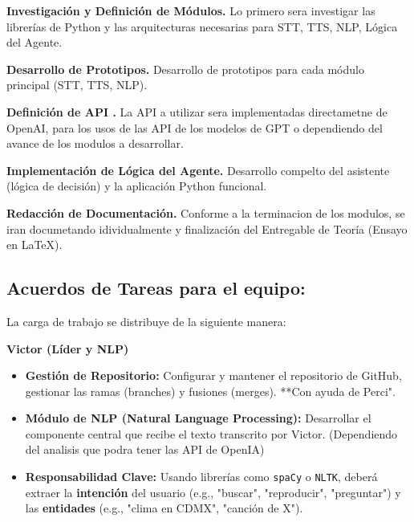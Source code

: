 \documentclass[a4paper,12pt]{article}
\begin{document}
\begin{description}
    \item\textbf{Investigación y Definición de Módulos.} Lo primero sera investigar las librerías de Python y las arquitecturas necesarias para STT, TTS, NLP, Lógica del Agente.
    
    \item \textbf{Desarrollo de Prototipos.} Desarrollo de prototipos para cada módulo principal (STT, TTS, NLP).
    
    \item\textbf{Definición de API .} La API a utilizar sera implementadas directametne de OpenAI, para los usos de las API de los modelos de GPT o dependiendo del avance de los modulos a desarrollar.
    
    \item\textbf{Implementación de Lógica del Agente.} Desarrollo compelto del asistente (lógica de decisión) y la aplicación Python funcional.
    
    \item\textbf{Redacción de Documentación.} Conforme a la terminacion de los modulos, se iran documetando idividualmente y finalización del Entregable de Teoría (Ensayo en LaTeX).
    
\end{description}


\subsection{Acuerdos de Tareas para el equipo:}
La carga de trabajo se distribuye de la siguiente manera:

\textbf{Victor (Líder y NLP)}
\begin{itemize}
    \item \textbf{Gestión de Repositorio:} Configurar y mantener el repositorio de GitHub, gestionar las ramas (branches) y fusiones (merges). **Con ayuda de Perci".
    \item \textbf{Módulo de NLP (Natural Language Processing):} Desarrollar el componente central que recibe el texto transcrito por Victor. (Dependiendo del analisis que podra tener las API de OpenIA)
    \item \textbf{Responsabilidad Clave:} Usando librerías como \texttt{spaCy} o \texttt{NLTK}, deberá extraer la \textbf{intención} del usuario (e.g., "buscar", "reproducir", "preguntar") y las \textbf{entidades} (e.g., "clima en CDMX", "canción de X").
\end{itemize}
\end{document}
